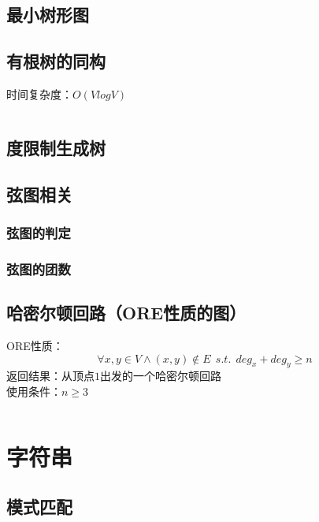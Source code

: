 \documentclass[a4paper]{article}
\newcommand{\cppcode}[1]{
    \inputminted[mathescape]{cpp}{source/#1}
}
\begin{document}
\cppcode{graph-theory/minimum-cut-stoer-wagner.cpp}

\subsection{最小树形图}

\subsection{有根树的同构}

时间复杂度：$O(V log V)$

\cppcode{graph-theory/rooted-tree-isomorphism.cpp}

\subsection{度限制生成树}

\subsection{弦图相关}

\subsubsection{弦图的判定}

\subsubsection{弦图的团数}

\subsection{哈密尔顿回路（ORE性质的图）}

ORE性质：$$\forall x,y \in V \wedge (x,y) \notin E \ \ s.t. \ \ deg_x+deg_y \geq n$$
\indent 返回结果：从顶点$1$出发的一个哈密尔顿回路\\
\indent 使用条件：$n \geq 3$

\cppcode{graph-theory/hamiltonian-circuit-ore.cpp}

\section{字符串}

\subsection{模式匹配}
\end{document}
